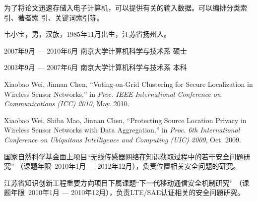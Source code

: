 \documentclass[master]{njuthesis}
\begin{document}
为了将论文迅速存储入电子计算机，可以提供有关的输入数据。可以编排分类索引、著者索
引、关键词索引等。

\backmatter


\nocite{*}


%
%

\begin{resume}
\begin{authorinfo}
\noindent 韦小宝，男，汉族，1985年11月出生，江苏省扬州人。
\end{authorinfo}
\begin{education}
\item[2007年9月 --- 2010年6月] 南京大学计算机科学与技术系 \hfill 硕士
\item[2003年9月 --- 2007年6月] 南京大学计算机科学与技术系 \hfill 本科
\end{education}
\begin{publications}
\item Xiaobao Wei, Jinnan Chen, ``Voting-on-Grid Clustering for Secure
  Localization in Wireless Sensor Networks,'' in \textsl{Proc. IEEE International
    Conference on Communications (ICC) 2010}, May. 2010.
\item Xiaobao Wei, Shiba Mao, Jinnan Chen, ``Protecting Source Location Privacy
  in Wireless Sensor Networks with Data Aggregation,'' in \textsl{Proc. 6th
    International Conference on Ubiquitous Intelligence and Computing (UIC)
    2009}, Oct. 2009.
\end{publications}
\begin{projects}
\item 国家自然科学基金面上项目``无线传感器网络在知识获取过程中的若干安全问题研究''
（课题年限~2010年1月 --- 2012年12月），负责位置相关安全问题的研究。
\item 江苏省知识创新工程重要方向项目下属课题``下一代移动通信安全机制研究''
（课题年限~2010年1月 --- 2010年12月），负责LTE/SAE认证相关的安全问题研究。
\end{projects}
\end{resume}

\makelicense

\end{document}
